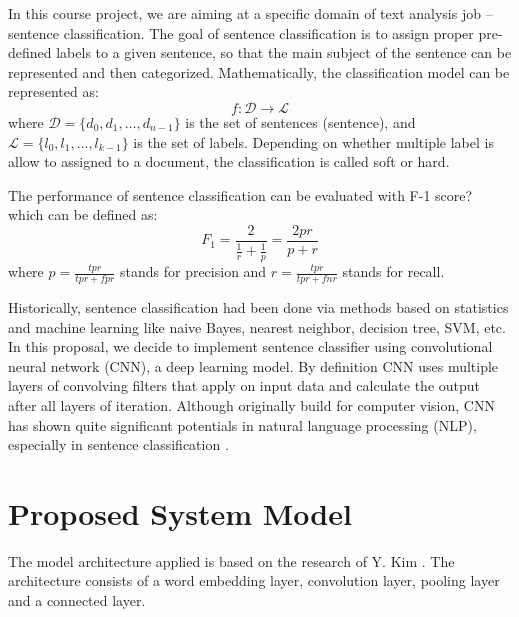 \documentclass[conference]{IEEEtran}
\begin{document}
    In this course project, we are aiming at a specific domain of text analysis
    job -- sentence classification. The goal of sentence classification is to assign
    proper pre-defined labels to a given sentence, so that the main subject of the 
    sentence can be represented and then categorized\cite{allahyari2017brief}. 
    Mathematically, the classification model can be represented as:
    $$f:\mathcal{D}\rightarrow\mathcal{L}$$
    where $\mathcal{D}=\{d_0, d_1,\ldots, d_{n-1}\}$ is the set of sentences
    (sentence), and $\mathcal{L}=\{l_0, l_1,\ldots, l_{k-1}\}$ is the set of labels.
    Depending on whether multiple label is allow to assigned to a document, the 
    classification is called soft or hard\cite{gopal2010multilabel}.
    
    The performance of sentence classification can be evaluated with F-1 score?
    which can be defined as\cite{forman2003extensive}:
    $$F_1=\frac{2}{\frac{1}{r}+\frac{1}{p}}=\frac{2pr}{p+r}$$
    where $p=\frac{tpr}{tpr+fpr}$ stands for precision and $r=\frac{tpr}{tpr+fnr}$ 
    stands for recall.
    
    Historically, sentence classification had been done via methods based on 
    statistics and machine learning like naive Bayes, nearest neighbor, decision 
    tree, SVM, etc. In this proposal, we decide to implement sentence classifier
    using convolutional neural network (CNN), a deep learning model. By definition
    CNN uses multiple layers of convolving filters that apply on input data and 
    calculate the output after all layers of iteration. Although originally 
    build for computer vision, CNN has shown quite significant potentials in 
    natural language processing (NLP), especially in sentence classification
    \cite{kim2014convolutional}.

\section{Proposed System Model}
The model architecture applied is based on the research of Y. Kim \cite{kim2014convolutional}. The architecture 
consists of a word embedding layer, convolution layer, pooling layer and a connected
layer. 
\end{document}
